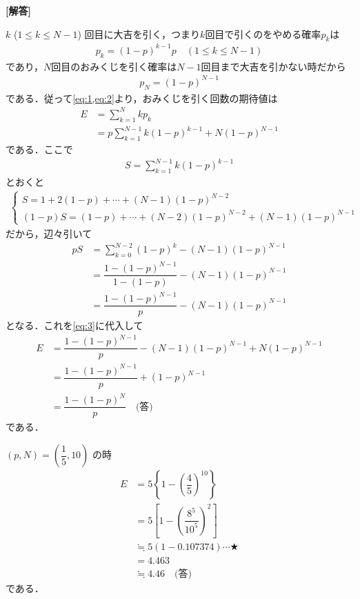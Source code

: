 \documentclass[../../main.tex]{subfiles}
\begin{document}
\begin{oframed}
  
\end{oframed}

{\bf [解答]}

$k$ ($1 \le k \le N-1$) 回目に大吉を引く，つまり$k$回目で引くのをやめる確率$p_k$は
\begin{align}
  p_k = (1-p)^{k-1}p \quad (1 \le k \le N-1) \label{eq:1}
\end{align}
であり，$N$回目のおみくじを引く確率は$N-1$回目まで大吉を引かない時だから
\begin{align}
  p_N = (1-p)^{N-1} \label{eq:2}
\end{align}
である．従って\cref{eq:1,eq:2}より，おみくじを引く回数の期待値は
\begin{align}
  E
  &= \sum_{k=1}^N k p_k \\
  &= p\sum_{k=1}^{N-1} k(1-p)^{k-1} + N(1-p)^{N-1} \label{eq:3}
\end{align}
である．ここで
\begin{align}
  S = \sum_{k=1}^{N-1} k(1-p)^{k-1}
\end{align}
とおくと
\begin{align}
  \begin{cases}
    S  = 1 + 2(1-p) + \cdots + (N-1)(1-p)^{N-2} \\
    (1-p)S = (1-p) + \cdots + (N-2)(1-p)^{N-2} + (N-1)(1-p)^{N-1}
  \end{cases}
\end{align}
だから，辺々引いて
\begin{align}
  pS
  &= \sum_{k=0}^{N-2} (1-p)^k - (N-1)(1-p)^{N-1} \\
  &= \dfrac{1-(1-p)^{N-1}}{1-(1-p)} - (N-1)(1-p)^{N-1} \\
  &= \dfrac{1-(1-p)^{N-1}}{p} - (N-1)(1-p)^{N-1}
\end{align}
となる．これを\cref{eq:3}に代入して
\begin{align}
  E
  &= \dfrac{1-(1-p)^{N-1}}{p} - (N-1)(1-p)^{N-1} + N(1-p)^{N-1} \\
  &= \dfrac{1-(1-p)^{N-1}}{p} + (1-p)^{N-1} \\
  &= \dfrac{1-(1-p)^N}{p} \quad \text{(答)}
\end{align}
である．

$(p, N) = \left(\dfrac{1}{5}, 10\right)$ の時
\begin{align}
  E &= 5 \left\{ 1 - \left(\dfrac{4}{5}\right)^{10} \right\} \\
  &= 5 \left[ 1 - \left(\dfrac{8^5}{10^5}\right)^2 \right] \\
  &\fallingdotseq 5 ( 1 - 0.107374 ) \cdots \bigstar \\
  &= 4.463 \\
  &\fallingdotseq 4.46 \quad \text{(答)}
\end{align}
である．
\end{document}
